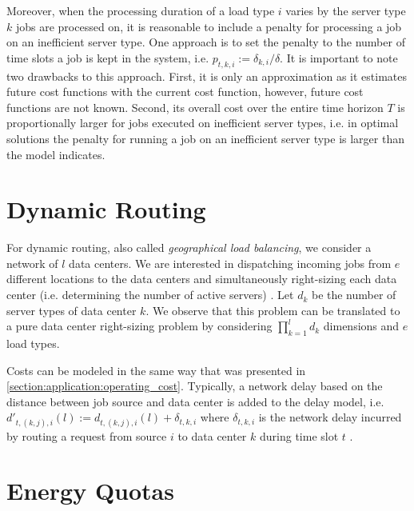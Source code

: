 Moreover, when the processing duration of a load type $i$ varies by the server type $k$ jobs are processed on, it is reasonable to include a penalty for processing a job on an inefficient server type. One approach is to set the penalty to the number of time slots a job is kept in the system, i.e. $p_{t,k,i} := \delta_{k,i} / \delta$. It is important to note two drawbacks to this approach. First, it is only an approximation as it estimates future cost functions with the current cost function, however, future cost functions are not known. Second, its overall cost over the entire time horizon $T$ is proportionally larger for jobs executed on inefficient server types, i.e. in optimal solutions the penalty for running a job on an inefficient server type is larger than the model indicates.

\section{Dynamic Routing}\label{section:application:dynamic_routing}

For dynamic routing, also called \textit{geographical load balancing}, we consider a network of $l$ data centers. We are interested in dispatching incoming jobs from $e$ different locations to the data centers and simultaneously right-sizing each data center (i.e. determining the number of active servers) \cite{Lin2012}. Let $d_k$ be the number of server types of data center $k$. We observe that this problem can be translated to a pure data center right-sizing problem by considering $\prod_{k=1}^l d_k$ dimensions and $e$ load types.

Costs can be modeled in the same way that was presented in \autoref{section:application:operating_cost}. Typically, a network delay based on the distance between job source and data center is added to the delay model, i.e. $d'_{t,(k,j),i}(l) := d_{t,(k,j),i}(l) + \delta_{t,k,i}$ where $\delta_{t,k,i}$ is the network delay incurred by routing a request from source $i$ to data center $k$ during time slot $t$ \cite{Lin2012}.

\section{Energy Quotas}\label{section:application:energy_quotas}


